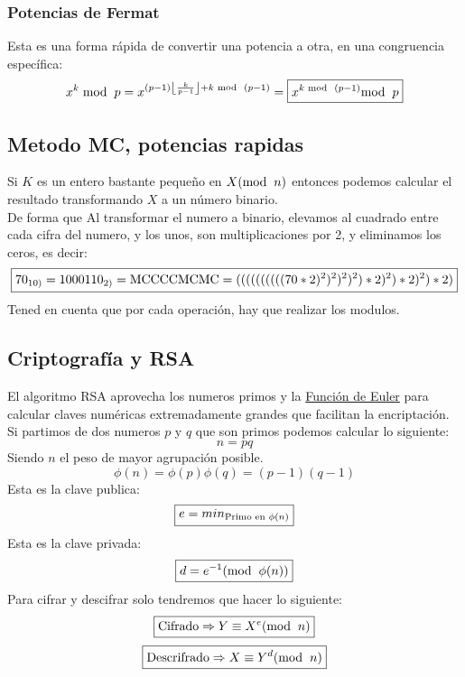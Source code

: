 \subsubsection{Potencias de Fermat}
 Esta es una forma rápida de convertir una potencia a otra, en una congruencia específica:
\[
        x^k\hspace{1mm}\textnormal{mod}\hspace{2mm}p = x^{(p-1)\left \lfloor \frac{k}{p-1} \right \rfloor + k\hspace{1mm}\textnormal{mod}\hspace{2mm}(p-1)}=\boxed{x^{k\hspace{1mm}\textnormal{mod}\hspace{2mm}(p-1)}\textnormal{mod}\hspace{2mm}p}
\]
\subsection{Metodo MC, potencias rapidas}
 Si \(K\) es un entero bastante pequeño en \(X (\textnormal{mod}\hspace{2mm}n)\) entonces podemos calcular el resultado transformando \(X\) a un número binario. \\De forma que Al transformar el numero a binario, elevamos al cuadrado entre cada cifra del numero, y los unos, son multiplicaciones por 2, y eliminamos los ceros, es decir:
\[
        \boxed{70_{10)} = 1000110_{2)} = \textnormal{M}\textnormal{C}\textnormal{C}\textnormal{C}\textnormal{C}\textnormal{M}\textnormal{C}\textnormal{M}\textnormal{C} = ((((((((((70*2)^2)^2)^2)^2)*2)^2)*2)^2)*2)}
\]
 Tened en cuenta que por cada operación, hay que realizar los modulos.
\subsection{Criptografía y RSA}
 El algoritmo RSA aprovecha los numeros primos y la \underline{Función de Euler} para calcular claves numéricas extremadamente grandes que facilitan la encriptación.\\ Si partimos de dos numeros \(p\) y \(q\) que son primos podemos calcular lo siguiente:
\[
        \boxed{n = pq}
\]
 Siendo \(n\) el peso de mayor agrupación posible.
\[
        \boxed{\phi(n) = \phi(p)\phi(q) = (p-1)(q-1)}
\]
 Esta es la clave publica:
\[
        \boxed{e = min_{\textnormal{Primo en \(\phi(n)\)}}}
\]
 Esta es la clave privada:
\[
        \boxed{d = e^{-1} (\textnormal{mod} \hspace{2mm} \phi(n))}
\]
 Para cifrar y descifrar solo tendremos que hacer lo siguiente:
\[
        \boxed{\textnormal{Cifrado}\Rightarrow  Y \equiv X^e (\textnormal{mod}\hspace{2mm}n)}
\]
\[
        \boxed{\textnormal{Descrifrado}\Rightarrow X \equiv Y^d (\textnormal{mod}\hspace{2mm}n)}
\]